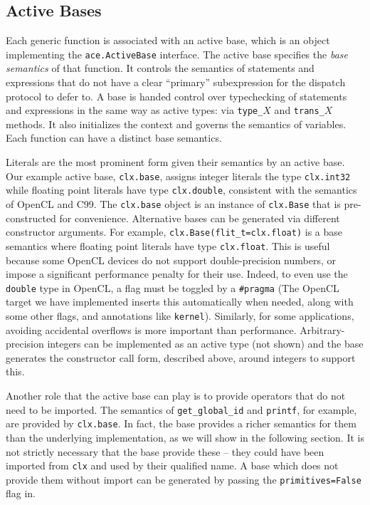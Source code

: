 \documentclass[9pt,preprint]{sigplanconf}
\begin{document}
\subsection{Active Bases}\label{abases}
Each generic function is associated with an active base, which is an object implementing the \verb|ace.ActiveBase| interface. The active base specifies the \emph{base semantics} of that function. It controls the semantics of statements and expressions that do not have a clear ``primary'' subexpression for the dispatch protocol to defer to. A base is handed control over typechecking of statements and expressions in the same way as active types: via \verb|type_|$X$ and \verb|trans_|$X$ methods. It also initializes the context and governs the semantics of variables. Each function can have a distinct base semantics.

Literals are the most prominent form given their semantics by an active base. Our example active base, \verb|clx.base|, assigns integer literals the type \verb|clx.int32| while floating point literals have type \verb|clx.double|, consistent with the semantics of OpenCL and C99. The \verb|clx.base| object is an instance of \verb|clx.Base| that is pre-constructed for convenience. Alternative bases can be generated via different constructor arguments. For example, \verb|clx.Base(flit_t=clx.float)| is a base semantics where floating point literals have type \verb|clx.float|. This is useful because some OpenCL devices do not support double-precision numbers, or impose a significant performance penalty for their use. Indeed, to even use the \verb|double| type in OpenCL, a flag must be toggled by a \verb|#pragma| (The OpenCL target we have implemented inserts this automatically when needed, along with some other flags, and annotations like \verb|kernel|).  Similarly, for some applications, avoiding accidental overflows is more important than performance.  Arbitrary-precision integers can be implemented as an active type (not shown) and the base generates the constructor call form, described above, around integers to support this.

Another role that the active base can play is to provide operators that do not need to be imported. The semantics of \verb|get_global_id| and \verb|printf|, for example, are provided by \verb|clx.base|. In fact, the base provides a richer semantics for them than the underlying implementation, as we will show in the following section. It is not strictly necessary that the base provide these -- they could have been imported from \verb|clx| and used by their qualified name. A base which does not provide them without import can be generated by passing the \verb|primitives=False| flag in.
\end{document}
